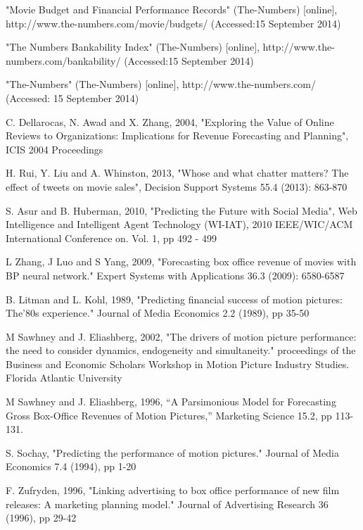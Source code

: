 \documentclass[conference]{IEEEtran}
\begin{document}
\begin{thebibliography}{1}
"Movie Budget and Financial Performance Records" (The-Numbers)  [online], http://www.the-numbers.com/movie/budgets/ (Accessed:15 September 2014)

"The Numbers Bankability Index" (The-Numbers) [online], http://www.the-numbers.com/bankability/ (Accessed:15 September 2014)

"The-Numbers" (The-Numbers) [online], http://www.the-numbers.com/ (Accessed: 15 September 2014)

C. Dellarocas, N. Awad and X. Zhang, 2004, "Exploring the Value of Online Reviews to Organizations: Implications for Revenue Forecasting and Planning", ICIS 2004 Proceedings

H. Rui, Y. Liu and A. Whinston, 2013, "Whose and what chatter matters? The effect of tweets on movie sales", Decision Support Systems 55.4 (2013): 863-870

S. Asur and B. Huberman, 2010, "Predicting the Future with Social Media", Web Intelligence and Intelligent Agent Technology (WI-IAT), 2010 IEEE/WIC/ACM International Conference on. Vol. 1, pp 492 - 499

L Zhang, J Luo and S Yang, 2009, "Forecasting box office revenue of movies with BP neural network." Expert Systems with Applications 36.3 (2009): 6580-6587

B. Litman and L. Kohl, 1989, "Predicting financial success of motion pictures: The'80s experience." Journal of Media Economics 2.2 (1989), pp 35-50

M Sawhney and J. Eliashberg, 2002, "The drivers of motion picture performance: the need to consider dynamics, endogeneity and simultaneity." proceedings of the Business and Economic Scholars Workshop in Motion Picture Industry Studies. Florida Atlantic University

M Sawhney and J. Eliashberg, 1996, “A Parsimonious Model
for Forecasting Gross Box-Office Revenues of Motion Pictures,” Marketing Science 15.2, pp 113-131.

S. Sochay, "Predicting the performance of motion pictures." Journal of Media Economics 7.4 (1994), pp 1-20

F. Zufryden, 1996, "Linking advertising to box office performance of new film releases: A marketing planning model." Journal of Advertising Research 36 (1996), pp 29-42


\end{thebibliography}
\end{document}
